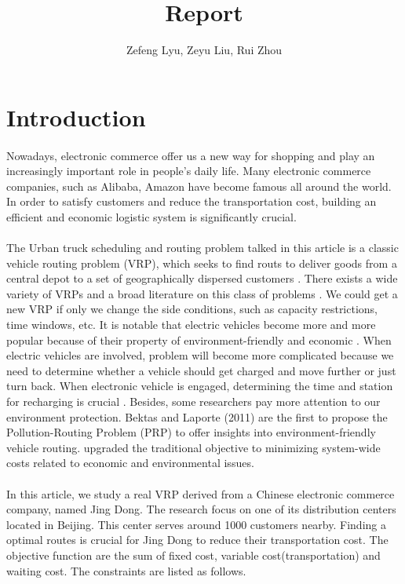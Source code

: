 \documentclass[12pt]{article}
\title{Report}
\author{Zefeng Lyu, Zeyu Liu, Rui Zhou}
\date{}
\numberwithin{equation}{section}
\begin{document}
\maketitle

\section{Introduction}

	\paragraph{}Nowadays, electronic commerce offer us a new way for shopping and play an increasingly important role in people’s daily life. Many electronic commerce companies, such as Alibaba, Amazon have become famous all around the world. In order to satisfy customers and reduce the transportation cost, building an efficient and economic logistic system is significantly crucial. 
	
	\paragraph{}The Urban truck scheduling and routing problem talked in this article is a classic vehicle routing problem (VRP), which seeks to find routs to deliver goods from a central depot to a set of geographically dispersed customers \parencite{Coelho2016}. There exists a wide variety of VRPs and a broad literature on this class of problems \parencite{Laporte1992}. We could get a new VRP if only we change the side conditions, such as capacity restrictions, time windows, etc. It is notable that electric vehicles become more and more popular because of their property of environment-friendly and economic \parencite{Hiermann2016}. When electric vehicles are involved, problem will become more complicated because we need to determine whether a vehicle should get charged and move further or just turn back. When electronic vehicle is engaged, determining the time and station for recharging is crucial \parencite{Zhang2018}. Besides, some researchers pay more attention to our environment protection. Bektas and Laporte (2011) are the first to propose the Pollution-Routing Problem (PRP) to offer insights into environment-friendly vehicle routing. \parencite{Lin2014} upgraded the traditional objective to minimizing system-wide costs related to economic and environmental issues.
	
	\paragraph{}In this article, we study a real VRP derived from a Chinese electronic commerce company, named Jing Dong. The research focus on one of its distribution centers located in Beijing. This center serves around 1000 customers nearby. Finding a optimal routes is crucial for Jing Dong to reduce their transportation cost. The objective function are the sum of fixed cost, variable cost(transportation) and waiting cost. The constraints are listed as follows. 
	
\end{document}

